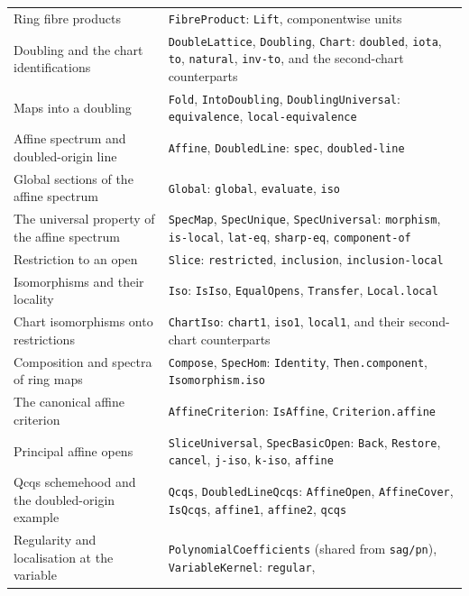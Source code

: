 \documentclass[11pt]{amsart}
\theoremstyle{definition}
\theoremstyle{remark}
\begin{document}
\begin{longtable}{@{}>{\raggedright\arraybackslash}p{}>{\raggedright\arraybackslash}p{}@{}}
Ring fibre products&
\texttt{FibreProduct}: \texttt{Lift}, componentwise units\\[4pt]
Doubling and the chart identifications&
\texttt{DoubleLattice}, \texttt{Doubling}, \texttt{Chart}:
\texttt{doubled}, \texttt{iota}, \texttt{to}, \texttt{natural},
\texttt{inv-to}, and the second-chart counterparts\\[4pt]
Maps into a doubling&
\texttt{Fold}, \texttt{IntoDoubling}, \texttt{DoublingUniversal}:
\texttt{equivalence}, \texttt{local-equivalence}\\[4pt]
Affine spectrum and doubled-origin line&
\texttt{Affine}, \texttt{DoubledLine}:
\texttt{spec}, \texttt{doubled-line}\\[4pt]
Global sections of the affine spectrum&
\texttt{Global}: \texttt{global}, \texttt{evaluate}, \texttt{iso}\\[4pt]
The universal property of the affine spectrum&
\texttt{SpecMap}, \texttt{SpecUnique}, \texttt{SpecUniversal}:
\texttt{morphism}, \texttt{is-local}, \texttt{lat-eq},
\texttt{sharp-eq}, \texttt{component-of}\\[4pt]
Restriction to an open&
\texttt{Slice}: \texttt{restricted}, \texttt{inclusion},
\texttt{inclusion-local}\\[4pt]
Isomorphisms and their locality&
\texttt{Iso}: \texttt{IsIso}, \texttt{EqualOpens},
\texttt{Transfer}, \texttt{Local.local}\\[4pt]
Chart isomorphisms onto restrictions&
\texttt{ChartIso}: \texttt{chart1}, \texttt{iso1},
\texttt{local1}, and their second-chart counterparts\\[4pt]
Composition and spectra of ring maps&
\texttt{Compose}, \texttt{SpecHom}:
\texttt{Identity}, \texttt{Then.component}, \texttt{Isomorphism.iso}\\[4pt]
The canonical affine criterion&
\texttt{AffineCriterion}: \texttt{IsAffine},
\texttt{Criterion.affine}\\[4pt]
Principal affine opens&
\texttt{SliceUniversal}, \texttt{SpecBasicOpen}:
\texttt{Back}, \texttt{Restore}, \texttt{cancel},
\texttt{j-iso}, \texttt{k-iso}, \texttt{affine}\\[4pt]
Qcqs schemehood and the doubled-origin example&
\texttt{Qcqs}, \texttt{DoubledLineQcqs}:
\texttt{AffineOpen}, \texttt{AffineCover}, \texttt{IsQcqs},
\texttt{affine1}, \texttt{affine2}, \texttt{qcqs}\\[4pt]
Regularity and localisation at the variable&
\texttt{PolynomialCoefficients} (shared from \texttt{sag/pn}),
\texttt{VariableKernel}: \texttt{regular},

\end{longtable}
\end{document}
